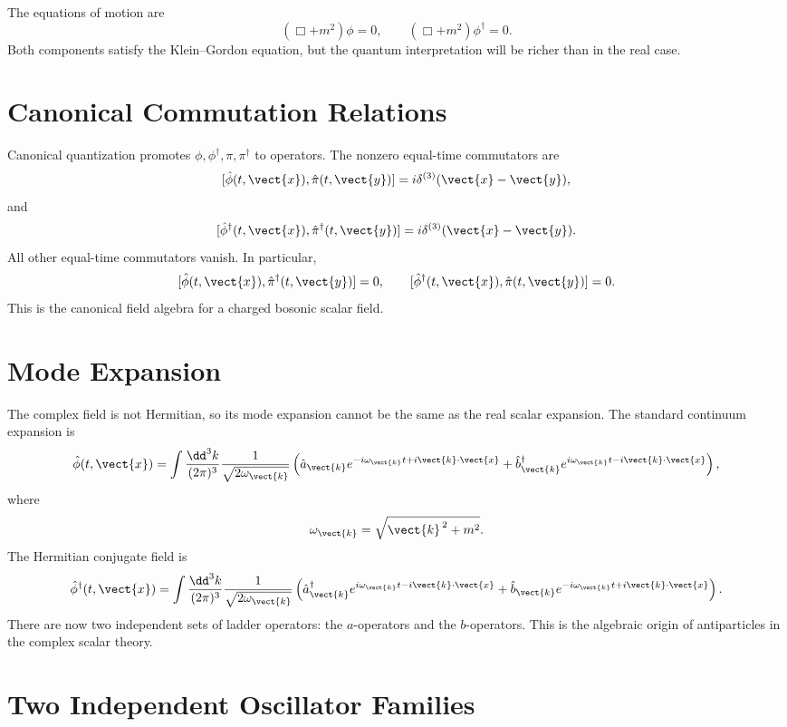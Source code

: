 The equations of motion are
\[
    (\Box+m^2)\phi=0,
    \qquad
    (\Box+m^2)\phi^\dagger=0.
\]
Both components satisfy the Klein--Gordon equation, but the quantum
interpretation will be richer than in the real case.

\section{Canonical Commutation Relations}

Canonical quantization promotes
\(\phi,\phi^\dagger,\pi,\pi^\dagger\) to operators. The nonzero equal-time
commutators are
\[
    [\hat\phi(t,\vect{x}),\hat\pi(t,\vect{y})]
    = i\delta^{(3)}(\vect{x}-\vect{y}),
\]
and
\[
    [\hat\phi^\dagger(t,\vect{x}),\hat\pi^\dagger(t,\vect{y})]
    = i\delta^{(3)}(\vect{x}-\vect{y}).
\]
All other equal-time commutators vanish. In particular,
\[
    [\hat\phi(t,\vect{x}),\hat\pi^\dagger(t,\vect{y})]=0,
    \qquad
    [\hat\phi^\dagger(t,\vect{x}),\hat\pi(t,\vect{y})]=0.
\]
This is the canonical field algebra for a charged bosonic scalar field.

\section{Mode Expansion}

The complex field is not Hermitian, so its mode expansion cannot be the same as
the real scalar expansion. The standard continuum expansion is
\[
    \hat\phi(t,\vect{x})
    = \int\frac{\dd^3k}{(2\pi)^3}
      \frac{1}{\sqrt{2\omega_{\vect{k}}}}
      \left(
          \hat a_{\vect{k}}
          e^{-i\omega_{\vect{k}}t+i\vect{k}\cdot\vect{x}}
          +
          \hat b_{\vect{k}}^\dagger
          e^{i\omega_{\vect{k}}t-i\vect{k}\cdot\vect{x}}
      \right),
\]
where
\[
    \omega_{\vect{k}}=\sqrt{\vect{k}^{\,2}+m^2}.
\]
The Hermitian conjugate field is
\[
    \hat\phi^\dagger(t,\vect{x})
    = \int\frac{\dd^3k}{(2\pi)^3}
      \frac{1}{\sqrt{2\omega_{\vect{k}}}}
      \left(
          \hat a_{\vect{k}}^\dagger
          e^{i\omega_{\vect{k}}t-i\vect{k}\cdot\vect{x}}
          +
          \hat b_{\vect{k}}
          e^{-i\omega_{\vect{k}}t+i\vect{k}\cdot\vect{x}}
      \right).
\]
There are now two independent sets of ladder operators: the \(a\)-operators and
the \(b\)-operators. This is the algebraic origin of antiparticles in the
complex scalar theory.

\section{Two Independent Oscillator Families}

